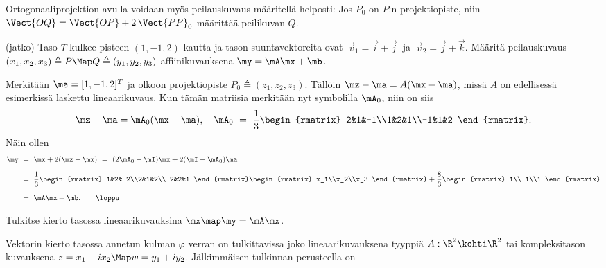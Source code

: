 Ortogonaaliprojektion avulla voidaan myös peilauskuvaus määritellä helposti: Jos $P_0$ on
$P$:n projektiopiste, niin $\Vect{OQ} = \Vect{OP} + 2\,\Vect{PP}_0$ määrittää peilikuvan $Q$.
\jatko \begin{Exa} (jatko) Taso $T$ kulkee pisteen $(1,-1,2)$ kautta ja tason suuntavektoreita
ovat $\ \vec{v}_1 = \vec{i} + \vec{j}\ $ ja $\ \vec{v}_2 = \vec{j} + \vec{k}$. Määritä 
peilauskuvaus $(x_1,x_2,x_3) \triangleq P \Map Q \triangleq (y_1,y_2,y_3)$ 
affiinikuvauksena $\my = \mA\mx + \mb$. 
\end{Exa}
\ratk Merkitään $\ma = [1,-1,2]^T$ ja olkoon projektiopiste $P_0 \triangleq (z_1,z_2,z_3)$. 
Tällöin $\mz-\ma = A(\mx-\ma)$, missä $A$ on edellisessä esimerkissä laskettu lineaarikuvaus. 
Kun tämän matriisia merkitään nyt symbolilla $\mA_0$, niin on siis
\[ 
\mz - \ma = \mA_0(\mx - \ma), \quad  \mA_0\ =\ \frac{1}{3} \begin{rmatrix} 
                                                           2&1&-1\\1&2&1\\-1&1&2 
                                                           \end{rmatrix}. 
\]
Näin ollen
\begin{align*}
\my\ &=\ \mx + 2(\mz - \mx)\ =\ (2\mA_0-\mI)\mx + 2(\mI-\mA_0)\ma \\[2mm]
     &=\ \frac{1}{3} \begin{rmatrix} 1&2&-2\\2&1&2\\-2&2&1 \end{rmatrix} 
                     \begin{rmatrix} x_1\\x_2\\x_3 \end{rmatrix}
                              + \frac{8}{3} \begin{rmatrix} 1\\-1\\1 \end{rmatrix} \\[2mm]
     &=\ \mA\mx + \mb. \quad\quad \loppu
\end{align*}
\begin{Exa} Tulkitse kierto tasossa lineaarikuvauksina $\mx \map \my = \mA\mx$. \end{Exa}
\ratk  Vektorin kierto tasossa annetun kulman $\varphi$ verran on tulkittavissa joko
lineaarikuvauksena tyyppiä $A: \R^2\kohti\R^2$ tai kompleksitason kuvauksena
$z = x_1 + i x_2 \Map w = y_1 + iy_2$. Jälkimmäisen tulkinnan perusteella on
